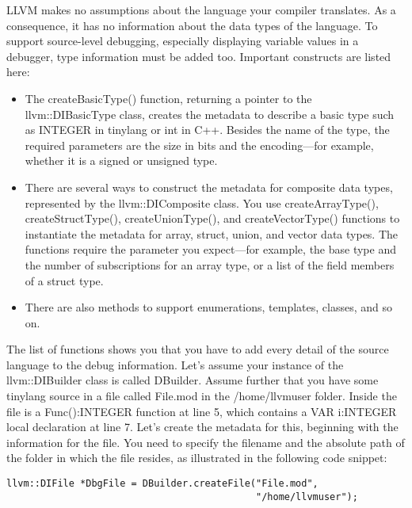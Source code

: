 LLVM makes no assumptions about the language your compiler translates. As a consequence, it has no information about the data types of the language. To support source-level debugging, especially displaying variable values in a debugger, type information must be added too. Important constructs are listed here:\par

\begin{itemize}
\item The createBasicType() function, returning a pointer to the llvm::DIBasicType class, creates the metadata to describe a basic type such as INTEGER in tinylang or int in C++. Besides the name of the type, the required parameters are the size in bits and the encoding—for example, whether it is a signed or unsigned type.

\item There are several ways to construct the metadata for composite data types, represented by the llvm::DIComposite class. You use createArrayType(), createStructType(), createUnionType(), and createVectorType() functions to instantiate the metadata for array, struct, union, and vector data types. The functions require the parameter you expect—for example, the base type and the number of subscriptions for an array type, or a list of the field members of a struct type.

\item There are also methods to support enumerations, templates, classes, and so on.
\end{itemize}

The list of functions shows you that you have to add every detail of the source language to the debug information. Let's assume your instance of the llvm::DIBuilder class is called DBuilder. Assume further that you have some tinylang source in a file called File.mod in the /home/llvmuser folder. Inside the file is a Func():INTEGER function at line 5, which contains a VAR i:INTEGER local declaration at line 7. Let's create the metadata for this, beginning with the information for the file. You need to specify the filename and the absolute path of the folder in which the file resides, as illustrated in the following code snippet:\par

\begin{lstlisting}[caption={}]
llvm::DIFile *DbgFile = DBuilder.createFile("File.mod",
											"/home/llvmuser");
\end{lstlisting}

